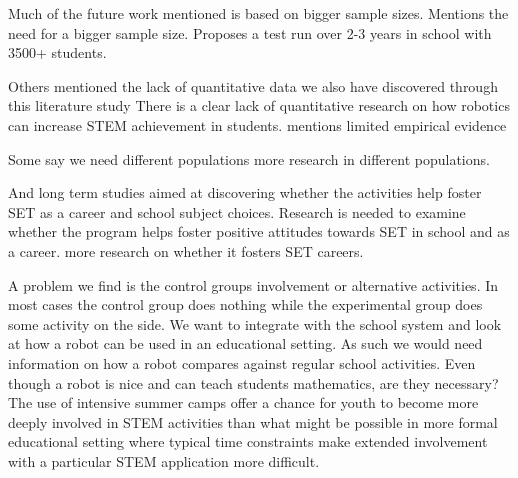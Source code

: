 \bigskip\noindent
Much of the future work mentioned is based on bigger sample sizes. 
\cite{mitnik2009collaborative} Mentions the need for a bigger sample size.
\cite{lindh2007does} Proposes a test run over 2-3 years in school with 3500+ students. 

\bigskip\noindent
Others mentioned the lack of quantitative data we also have discovered through this literature study
\cite{barker2007robotics} There is a clear lack of quantitative research on how robotics can increase STEM achievement in students. 
\cite{williams2007acquisition} mentions limited empirical evidence

\bigskip\noindent
Some say we need different populations
\cite{barker2007robotics} more research in different populations. 

\bigskip\noindent
And long term studies aimed at discovering whether the activities help foster SET as a career and school subject choices. 
\cite{barker2007robotics} Research is needed to examine whether the program helps foster positive attitudes towards SET in school and as a career.
\cite{barker2007robotics} more research on whether it fosters SET careers. 

\bigskip\noindent
A problem we find is the control groups involvement or alternative activities. In most cases the control group does nothing while the experimental group does some activity on the side. We want to integrate with the school system and look at how a robot can be used in an educational setting. As such we would need information on how a robot compares against regular school activities. Even though a robot is nice and can teach students mathematics, are they necessary?
\cite{nugent2009use} The use of intensive summer camps offer a chance for youth to become more deeply involved in STEM activities than what might be possible in more formal educational setting where typical time constraints make extended involvement with a particular STEM application more difficult.